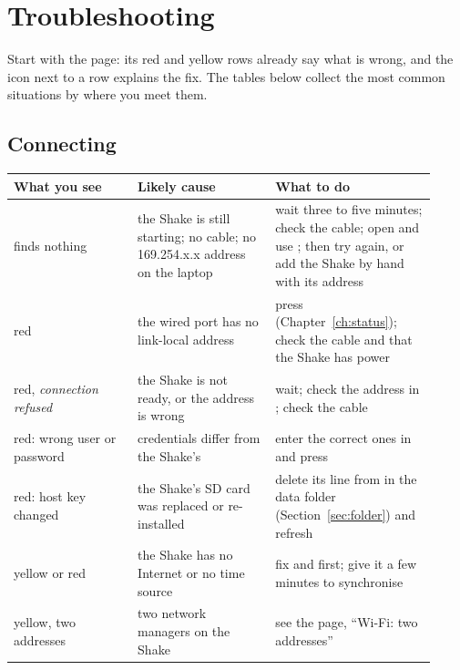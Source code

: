 \chapter{Troubleshooting}\label{ch:trouble}

Start with the  page: its red and yellow rows already say what is wrong, and the  icon next to a
row explains the fix. The tables below collect the most common situations by where you meet them.

\section{Connecting}
\begin{longtable}{@{}L{0.27\linewidth}L{0.30\linewidth}L{0.35\linewidth}@{}}
\toprule
What you see & Likely cause & What to do\\ \midrule\endhead
{} finds nothing & the Shake is still starting; no cable; no 169.254.x.x address on the laptop & wait three to five minutes; check the cable; open  and use ; then try again, or add the Shake by hand with its address\\
 red & the wired port has no link-local address & press  (Chapter~\ref{ch:status}); check the cable and that the Shake has power\\
 red, \emph{connection refused} & the Shake is not ready, or the address is wrong & wait; check the address in ; check the cable\\
 red: wrong user or password & credentials differ from the Shake's & enter the correct ones in  and press \\
 red: host key changed & the Shake's SD card was replaced or re-installed & delete its line from  in the data folder (Section~\ref{sec:folder}) and refresh\\
 yellow or red & the Shake has no Internet or no time source & fix  and  first; give it a few minutes to synchronise\\
 yellow, two addresses & two network managers on the Shake & see the  page, ``Wi-Fi: two addresses''\\
\bottomrule
\end{longtable}

